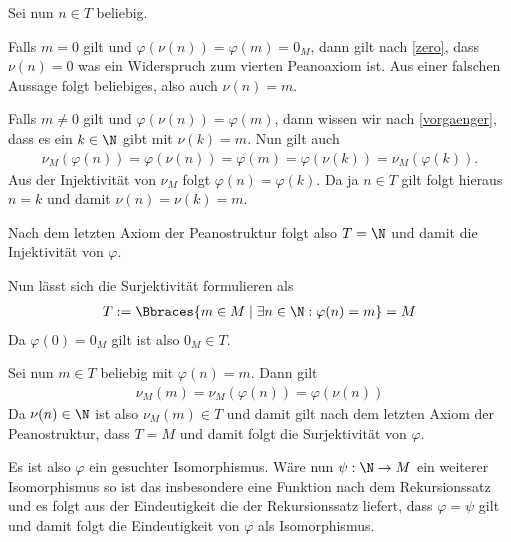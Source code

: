 \begin{solution}
    Sei nun $n \in T$ beliebig.

    Falls $m = 0$ gilt und $\varphi(\nu(n)) = \varphi(m) = 0_M$, dann gilt nach \eqref{zero}, dass $\nu(n) = 0$ was ein Widerspruch zum vierten Peanoaxiom ist. Aus einer falschen Aussage folgt beliebiges, also auch $\nu(n) = m$.

    Falls $m \neq 0$ gilt und $\varphi(\nu(n)) = \varphi(m)$, dann wissen wir nach \eqref{vorgaenger}, dass es ein $k \in \N$ gibt mit $\nu(k) = m$. Nun gilt auch
    \begin{align*}
        \nu_M(\varphi(n)) = \varphi(\nu(n)) = \varphi(m) = \varphi(\nu(k)) = \nu_M(\varphi(k)).
    \end{align*}
    Aus der Injektivität von $\nu_M$ folgt $\varphi(n) = \varphi(k)$. Da ja $n \in T$ gilt folgt hieraus $n = k$ und damit $\nu(n) = \nu(k) = m$.

    Nach dem letzten Axiom der Peanostruktur folgt also $T = \N$ und damit die Injektivität von $\varphi$.

    Nun lässt sich die Surjektivität formulieren als
    \begin{align*}
        T := \Bbraces{m \in M \mid \exists n \in \N: \varphi(n) = m} = M
    \end{align*}
    Da $\varphi(0) = 0_M$ gilt ist also $0_M \in T$.

    Sei nun $m \in T$ beliebig mit $\varphi(n) = m$. Dann gilt
    \begin{align*}
        \nu_M(m) = \nu_M(\varphi(n)) = \varphi(\nu(n))
    \end{align*}
    Da $\nu(n) \in \N$ ist also $\nu_M(m) \in T$ und damit gilt nach dem letzten Axiom der Peanostruktur, dass $T = M$ und damit folgt die Surjektivität von $\varphi$.

    Es ist also $\varphi$ ein gesuchter Isomorphismus. Wäre nun $\psi: \N \to M$ ein weiterer Isomorphismus so ist das insbesondere eine Funktion nach dem Rekursionssatz und es folgt aus der Eindeutigkeit die der Rekursionssatz liefert, dass $\varphi = \psi$ gilt und damit folgt die Eindeutigkeit von $\varphi$ als Isomorphismus.
\end{solution}
